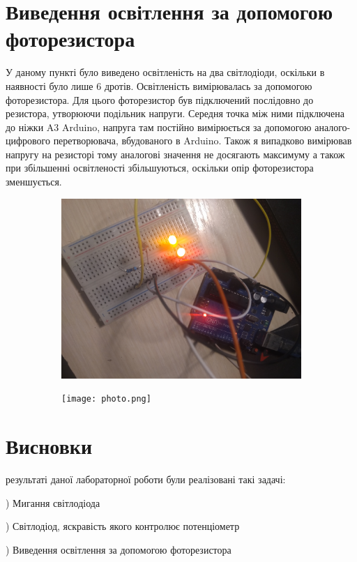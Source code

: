 \documentclass[a4paper,12pt]{article}
\begin{document}
\section{Виведення освітлення за допомогою фоторезистора}
\par У даному пункті було виведено освітленість на два світлодіоди, оскільки в наявності було лише 6 дротів. Освітленість вимірювалась за допомогою фоторезистора. Для цього фоторезистор був підключений послідовно до резистора, утворюючи подільник напруги. Середня точка між ними підключена до ніжки A3 Arduino, напруга там постійно вимірюється за допомогою аналого-цифрового перетворювача, вбудованого в Arduino. Також я випадково вимірював напругу на резисторі тому аналогові значення не досягають максимуму а також при збільшенні освітленості збільшуються, оскільки опір фоторезистора зменшується.
\par\quad\begin{figure}[!h]
  \centering
 \begin{subfigure}[b]{0.6\linewidth}
    \includegraphics[width=\linewidth]{photoresistor.jpg}
  \end{subfigure}
  \caption{}
\end{figure}
\par\quad\begin{figure}[!h]
  \centering
 \begin{subfigure}[b]{1\linewidth}
    \texttt{[image: photo.png]}
  \end{subfigure}
  \caption{}
\end{figure}

\clearpage\section{Висновки}
\par{} результаті даної лабораторної роботи були реалізовані такі задачі:
\par{}) Мигання світлодіода
\par{}) Світлодіод, яскравість якого контролює потенціометр
\par{}) Виведення освітлення за допомогою фоторезистора
\end{document}
